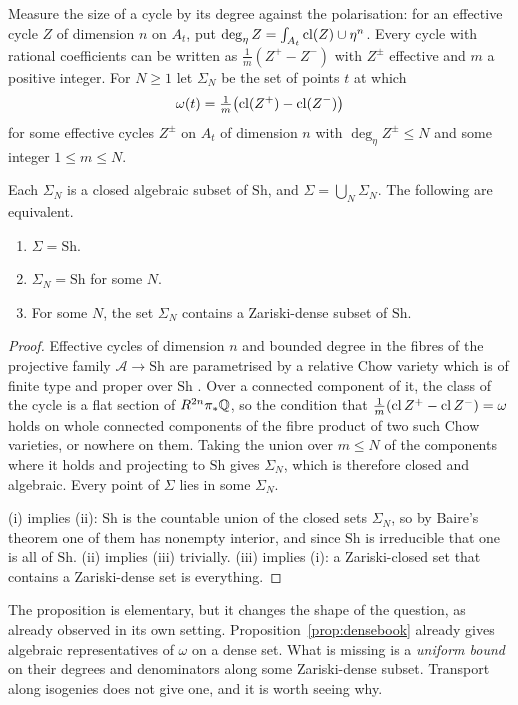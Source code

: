 Measure the size of a cycle by its degree against the polarisation: for an
effective cycle $Z$ of dimension $n$ on $A_{t}$, put
$\deg_{\eta}Z=\int_{A_{t}}\operatorname{cl}(Z)\cup\eta^{n}$. Every cycle with rational
coefficients can be written as $\frac1m(Z^{+}-Z^{-})$ with $Z^{\pm}$
effective and $m$ a positive integer. For $N\ge1$ let $\Sigma_{N}$ be the
set of points $t$ at which
\[
  \omega(t)=\tfrac1m\bigl(\operatorname{cl}(Z^{+})-\operatorname{cl}(Z^{-})\bigr)
\]
for some effective cycles $Z^{\pm}$ on $A_{t}$ of dimension $n$ with
$\deg_{\eta}Z^{\pm}\le N$ and some integer $1\le m\le N$.

\begin{proposition}\label{prop:boundedbook}
Each $\Sigma_{N}$ is a closed algebraic subset of $\mathrm{Sh}$, and
$\Sigma=\bigcup_{N}\Sigma_{N}$. The following are equivalent.
\begin{enumerate}[label=(\roman*)]
\item $\Sigma=\mathrm{Sh}$.
\item $\Sigma_{N}=\mathrm{Sh}$ for some $N$.
\item For some $N$, the set $\Sigma_{N}$ contains a Zariski-dense subset
of $\mathrm{Sh}$.
\end{enumerate}
\end{proposition}

\begin{proof}
Effective cycles of dimension $n$ and bounded degree in the fibres of the
projective family $\mathcal A\to\mathrm{Sh}$ are parametrised by a relative Chow
variety which is of finite type and proper over $\mathrm{Sh}$ \cite[Ch.~I]{Kol96}.
Over a connected component of it, the class of the cycle is a flat section
of $R^{2n}\pi_{*}\mathbb{Q}$, so the condition that
$\frac1m(\operatorname{cl} Z^{+}-\operatorname{cl} Z^{-})=\omega$ holds on whole connected components
of the fibre product of two such Chow varieties, or nowhere on them. Taking
the union over $m\le N$ of the components where it holds and projecting to
$\mathrm{Sh}$ gives $\Sigma_{N}$, which is therefore closed and algebraic. Every
point of $\Sigma$ lies in some $\Sigma_{N}$.

(i) implies (ii): $\mathrm{Sh}$ is the countable union of the closed sets
$\Sigma_{N}$, so by Baire's theorem one of them has nonempty interior, and
since $\mathrm{Sh}$ is irreducible that one is all of $\mathrm{Sh}$. (ii) implies (iii)
trivially. (iii) implies (i): a Zariski-closed set that contains a
Zariski-dense set is everything.
\end{proof}

The proposition is elementary, but it changes the shape of the question,
as \cite{BhH8} already observed in its own setting.
Proposition~\ref{prop:densebook} already gives algebraic representatives of
$\omega$ on a dense set. What is missing is a \emph{uniform bound} on their
degrees and denominators along some Zariski-dense subset. Transport along
isogenies does not give one, and it is worth seeing why.

